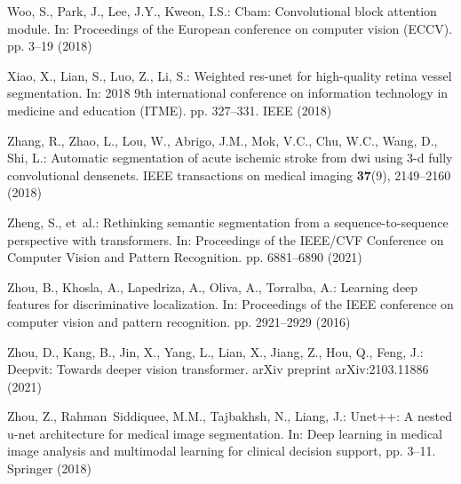 \documentclass[runningheads]{llncs}
\begin{document}
\begin{thebibliography}{10}
Woo, S., Park, J., Lee, J.Y., Kweon, I.S.: Cbam: Convolutional block attention
  module. In: Proceedings of the European conference on computer vision (ECCV).
  pp. 3--19 (2018)

Xiao, X., Lian, S., Luo, Z., Li, S.: Weighted res-unet for high-quality retina
  vessel segmentation. In: 2018 9th international conference on information
  technology in medicine and education (ITME). pp. 327--331. IEEE (2018)

Zhang, R., Zhao, L., Lou, W., Abrigo, J.M., Mok, V.C., Chu, W.C., Wang, D.,
  Shi, L.: Automatic segmentation of acute ischemic stroke from dwi using 3-d
  fully convolutional densenets. IEEE transactions on medical imaging
  \textbf{37}(9),  2149--2160 (2018)

Zheng, S., et~al.: Rethinking semantic segmentation from a sequence-to-sequence
  perspective with transformers. In: Proceedings of the IEEE/CVF Conference on
  Computer Vision and Pattern Recognition. pp. 6881--6890 (2021)

Zhou, B., Khosla, A., Lapedriza, A., Oliva, A., Torralba, A.: Learning deep
  features for discriminative localization. In: Proceedings of the IEEE
  conference on computer vision and pattern recognition. pp. 2921--2929 (2016)

Zhou, D., Kang, B., Jin, X., Yang, L., Lian, X., Jiang, Z., Hou, Q., Feng, J.:
  Deepvit: Towards deeper vision transformer. arXiv preprint arXiv:2103.11886
  (2021)

Zhou, Z., Rahman~Siddiquee, M.M., Tajbakhsh, N., Liang, J.: Unet++: A nested
  u-net architecture for medical image segmentation. In: Deep learning in
  medical image analysis and multimodal learning for clinical decision support,
  pp. 3--11. Springer (2018)

\end{thebibliography}
\end{document}
